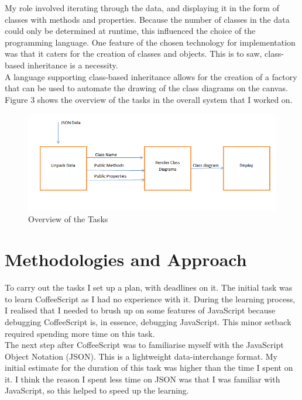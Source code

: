 \documentclass[titlepage,a4paper,11pt]{report}
\begin{document}
\indent My role involved iterating through the data, and displaying it in the form of classes with methods and properties. Because the number of classes in the data could only be determined at runtime, this influenced the choice of the programming language. One feature of the chosen technology for implementation was that it caters for the creation of classes and objects. This is to saw, class-based inheritance is a necessity.\\

\indent A language supporting class-based inheritance allows for the creation of a factory that can be used to automate the drawing of the class diagrams on the canvas. Figure 3 shows the overview of the tasks in the overall system that I worked on.

\begin{figure} [H]
\includegraphics[scale=0.8] {design.png}
\caption{Overview of the Tasks}
\label{class}
\end{figure}


\section{Methodologies and Approach}
To carry out the tasks I set up a plan, with deadlines on it. The initial task was to learn CoffeeScript as I had no experience with it. During the learning process, I realised that I needed to brush up on some features of JavaScript because debugging CoffeeScript is, in essence, debugging JavaScript. This minor setback required spending more time on this task. \\

\indent The next step after CoffeeScript was to familiarise myself with the JavaScript Object Notation (JSON). This is a lightweight data-interchange format. My initial estimate for the duration of this task was higher than the time I spent on it. I think the reason I spent less time on JSON was that I was familiar with JavaScript, so this helped to speed up the learning. \\
\end{document}
